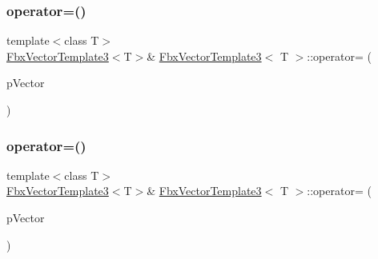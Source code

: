 \mbox{\label{class_fbx_vector_template3_a6776a6fce109a4e5eac1ef4efb56f070}} 
\subsubsection{\texorpdfstring{operator=()}{operator=()}\hspace{0.1cm}{\footnotesize\ttfamily [2/3]}}
{\footnotesize\ttfamily template$<$class T$>$ \\
\hyperlink{class_fbx_vector_template3}{Fbx\+Vector\+Template3}$<$T$>$\& \hyperlink{class_fbx_vector_template3}{Fbx\+Vector\+Template3}$<$ T $>$\+::operator= (\begin{DoxyParamCaption}\item[{const \hyperlink{class_fbx_vector_template2}{Fbx\+Vector\+Template2}$<$ T $>$ \&}]{p\+Vector }\end{DoxyParamCaption})}

\mbox{\label{class_fbx_vector_template3_a19181aa6e706a12de98b417624e67e4d}} 
\subsubsection{\texorpdfstring{operator=()}{operator=()}\hspace{0.1cm}{\footnotesize\ttfamily [3/3]}}
{\footnotesize\ttfamily template$<$class T$>$ \\
\hyperlink{class_fbx_vector_template3}{Fbx\+Vector\+Template3}$<$T$>$\& \hyperlink{class_fbx_vector_template3}{Fbx\+Vector\+Template3}$<$ T $>$\+::operator= (\begin{DoxyParamCaption}\item[{const \hyperlink{class_fbx_vector_template3}{Fbx\+Vector\+Template3}$<$ T $>$ \&}]{p\+Vector }\end{DoxyParamCaption})}

\mbox{\label{class_fbx_vector_template3_aed608afc6dbe8e27447be99120546582}} 
